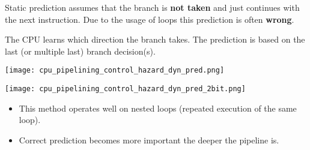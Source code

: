 Static prediction assumes that the branch is \textbf{not taken} and just continues with the next instruction. Due to the usage of loops this prediction is often \textbf{wrong}.

\newpar{}

The CPU learns which direction the branch takes. The prediction is based on the last (or multiple last) branch decision(s). %
\begin{center}
    \texttt{[image: cpu\_pipelining\_control\_hazard\_dyn\_pred.png]}
\end{center}

\newpar{}
\begin{center}
    \texttt{[image: cpu\_pipelining\_control\_hazard\_dyn\_pred\_2bit.png]}
\end{center}

\begin{itemize}
    \item This method operates well on nested loops (repeated execution of the same loop).
    \item Correct prediction becomes more important the deeper the pipeline is.
\end{itemize}


